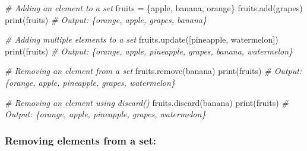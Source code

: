\documentclass[11pt]{article}
\newenvironment{Shaded}{}{}
\newcommand{\StringTok}[1]{\textcolor[rgb]{0.25,0.44,0.63}{{#1}}}
\newcommand{\CommentTok}[1]{\textcolor[rgb]{0.38,0.63,0.69}{\textit{{#1}}}}
\newcommand{\NormalTok}[1]{{#1}}
\newcommand{\OperatorTok}[1]{\textcolor[rgb]{0.40,0.40,0.40}{{#1}}}
\newcommand{\BuiltInTok}[1]{{#1}}
\begin{document}
\begin{Shaded}
\begin{Highlighting}[]
\CommentTok{\# Adding an element to a set}
\NormalTok{fruits }\OperatorTok{=}\NormalTok{ \{}\StringTok{\textquotesingle{}apple\textquotesingle{}}\NormalTok{, }\StringTok{\textquotesingle{}banana\textquotesingle{}}\NormalTok{, }\StringTok{\textquotesingle{}orange\textquotesingle{}}\NormalTok{\}}
\NormalTok{fruits.add(}\StringTok{\textquotesingle{}grapes\textquotesingle{}}\NormalTok{)}
\BuiltInTok{print}\NormalTok{(fruits) }\CommentTok{\# Output: \{\textquotesingle{}orange\textquotesingle{}, \textquotesingle{}apple\textquotesingle{}, \textquotesingle{}grapes\textquotesingle{}, \textquotesingle{}banana\textquotesingle{}\}}

\CommentTok{\# Adding multiple elements to a set}
\NormalTok{fruits.update([}\StringTok{\textquotesingle{}pineapple\textquotesingle{}}\NormalTok{, }\StringTok{\textquotesingle{}watermelon\textquotesingle{}}\NormalTok{])}
\BuiltInTok{print}\NormalTok{(fruits) }\CommentTok{\# Output: \{\textquotesingle{}orange\textquotesingle{}, \textquotesingle{}apple\textquotesingle{}, \textquotesingle{}pineapple\textquotesingle{}, \textquotesingle{}grapes\textquotesingle{}, \textquotesingle{}banana\textquotesingle{}, \textquotesingle{}watermelon\textquotesingle{}\}}

\CommentTok{\# Removing an element from a set}
\NormalTok{fruits.remove(}\StringTok{\textquotesingle{}banana\textquotesingle{}}\NormalTok{)}
\BuiltInTok{print}\NormalTok{(fruits) }\CommentTok{\# Output: \{\textquotesingle{}orange\textquotesingle{}, \textquotesingle{}apple\textquotesingle{}, \textquotesingle{}pineapple\textquotesingle{}, \textquotesingle{}grapes\textquotesingle{}, \textquotesingle{}watermelon\textquotesingle{}\}}

\CommentTok{\# Removing an element using discard()}
\NormalTok{fruits.discard(}\StringTok{\textquotesingle{}banana\textquotesingle{}}\NormalTok{)}
\BuiltInTok{print}\NormalTok{(fruits) }\CommentTok{\# Output: \{\textquotesingle{}orange\textquotesingle{}, \textquotesingle{}apple\textquotesingle{}, \textquotesingle{}pineapple\textquotesingle{}, \textquotesingle{}grapes\textquotesingle{}, \textquotesingle{}watermelon\textquotesingle{}\}}
\end{Highlighting}
\end{Shaded}

\hypertarget{removing-elements-from-a-set}{%
\subsubsection{Removing elements from a
set:}\label{removing-elements-from-a-set}}
\end{document}
